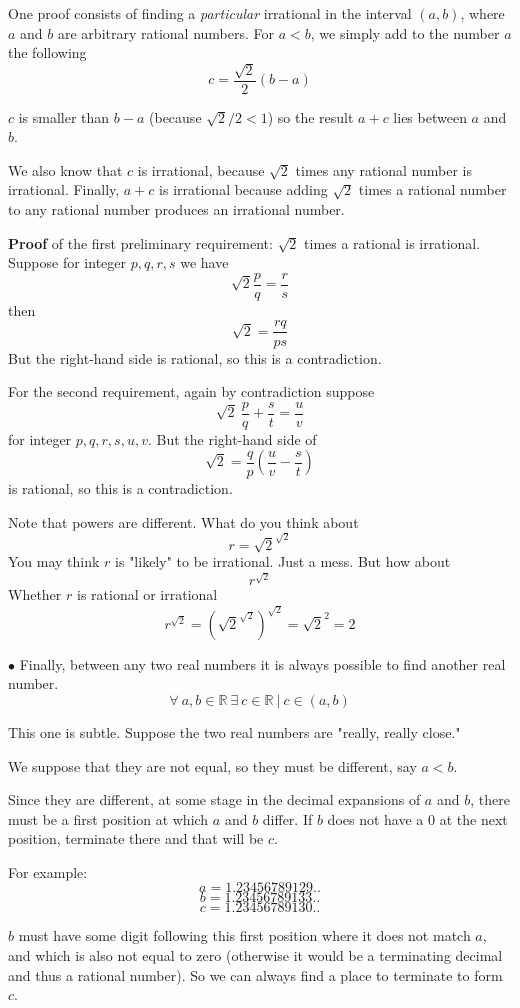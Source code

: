 \documentclass[11pt, oneside]{article}
\begin{document}
One proof consists of finding a \emph{particular} irrational in the interval $(a,b)$, where $a$ and $b$ are arbitrary rational numbers.  For $a < b$, we simply add to the number $a$ the following
\[ c = \frac{\sqrt{2}}{2}(b - a) \]

$c$ is smaller than $b - a$ (because $\sqrt{2}/2 < 1$) so the result $a + c$ lies between $a$ and $b$.  

We also know that $c$ is irrational, because $\sqrt{2}$ times any rational number is irrational.  Finally, $a + c$ is irrational because adding $\sqrt{2}$ times a rational number to any rational number produces an irrational number.

\textbf{Proof} of the first preliminary requirement:  $\sqrt{2}$ times a rational is irrational.  Suppose for integer $p, q, r, s$ we have
\[ \sqrt{2} \frac{p}{q} = \frac{r}{s} \]
then
\[ \sqrt{2} = \frac{rq}{ps} \]
But the right-hand side is rational, so this is a contradiction.

For the second requirement, again by contradiction suppose
\[ \sqrt{2} \ \frac{p}{q} +  \frac{s}{t} = \frac{u}{v} \]
for integer $p, q, r, s, u, v$.  But the right-hand side of
\[ \sqrt{2} = \frac{q}{p} ( \frac{u}{v} - \frac{s}{t}) \]
is rational, so this is a contradiction.

Note that powers are different.  What do you think about
\[ r = \sqrt{2}^{\sqrt{2}} \]
You may think $r$ is "likely" to be irrational.  Just a mess.  But how about
\[ r^{\sqrt{2}} \]
Whether $r$ is rational or irrational
\[ r^{\sqrt{2}} = (\sqrt{2}^{\sqrt{2}})^{\sqrt{2}} = \sqrt{2}^2 = 2 \]

$\bullet$  Finally, between any two real numbers it is always possible to find another real number.  
\[ \forall \ a,b \in \mathbb{R} \ \exists \ c \in \mathbb{R} \ | \ c \in (a,b) \]

This one is subtle.  Suppose the two real numbers are "really, really close."  

We suppose that they are not equal, so they must be different, say $a < b$.

Since they are different, at some stage in the decimal expansions of $a$ and $b$, there must be a first position at which $a$ and $b$ differ.  If $b$ does not have a $0$ at the next position, terminate there and that will be $c$.

For example:
\[ a = 1.23456789129.. \]
\[ b = 1.23456789133.. \]
\[ c = 1.23456789130.. \]

$b$ must have some digit following this first position where it does not match $a$, and which is also not equal to zero (otherwise it would be a terminating decimal and thus a rational number).  So we can always find a place to terminate to form $c$.
\end{document}
